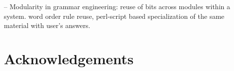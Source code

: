 \documentclass[11pt]{article}
\begin{document}
-- Modularity in grammar engineering: reuse of bits across modules within
a system.  word order rule reuse, perl-script based specialization of the
same material with user's answers.


\section*{Acknowledgements}



%

\end{document}
